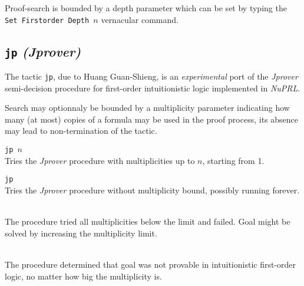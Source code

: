 Proof-search is bounded by a depth parameter which can be set by typing the
{\nobreak \tt Set Firstorder Depth $n$}  
vernacular command.

\subsection{{\tt jp} {\em (Jprover)}}
\label{jprover}

The tactic \texttt{jp}, due to Huang Guan-Shieng, is an {\it
  experimental} port of the {\em Jprover}\cite{SLKN01} semi-decision 
procedure for first-order intuitionistic logic implemented in {\em
  NuPRL}\cite{Kre02}. 

Search may optionnaly be bounded by a multiplicity parameter
indicating how many (at most) copies of a formula may be used in 
the proof process, its absence may lead to non-termination of the tactic.




\begin{Variants}
 \item {\tt jp $n$}\\
   Tries the {\em Jprover} procedure with multiplicities up to $n$,
   starting from 1.
 \item {\tt jp}\\
   Tries the {\em Jprover} procedure without multiplicity bound, 
   possibly running forever.
\end{Variants}

\begin{ErrMsgs}
 \item {}\\
   The procedure tried all multiplicities below the limit and
   failed. Goal might be solved by increasing the multiplicity limit. 
 \item {}\\
   The procedure determined that goal was not provable in
   intuitionistic first-order logic, no matter how big the
   multiplicity is.
\end{ErrMsgs}


